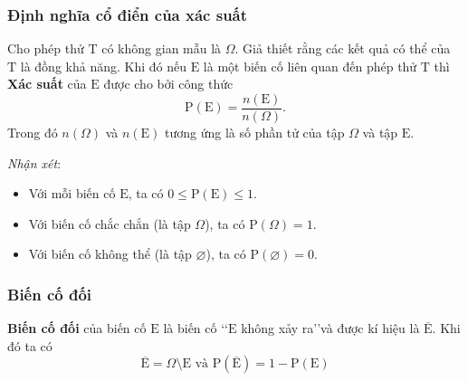\subsubsection{Định nghĩa cổ điển của xác suất}
\begin{boxdn}
		Cho phép thử $ \mathrm{T} $ có không gian mẫu là $ \Omega $. Giả thiết rằng các kết quả có thể của $ \mathrm{T} $ là đồng khả năng. Khi đó nếu $ \mathrm{E} $ là một biến cố liên quan đến phép thử $ \mathrm{T} $ thì {\bf{Xác suất}} của $ \mathrm{E} $ được cho bởi công thức $$\mathrm{P}(\mathrm{E})=\dfrac{n(\mathrm{E})}{n(\Omega)}.$$
	Trong đó $ n(\Omega) $ và $ n(\mathrm{E}) $ tương ứng là số phần tử của tập $ \Omega $ và tập $ \mathrm{E} $.
\end{boxdn}
\textit{Nhận xét}: 
\begin{itemize}
	\item Với mỗi biến cố $ \mathrm{E} $, ta có $ 0\leq \mathrm{P}(\mathrm{E})\leq 1 $.
	\item Với biến cố chắc chắn (là tập $ \Omega $), ta có $ \mathrm{P}(\Omega)=1 $.
	\item Với biến cố không thể (là tập $ \varnothing $), ta có $ \mathrm{P}(\varnothing)=0 $.
\end{itemize}

\subsubsection{Biến cố đối}
\begin{boxdn}
{\bf{Biến cố đối}} của biến cố $ \mathrm{E} $ là biến cố \lq\lq  $ \mathrm{E}$ không xảy ra\rq\rq và được kí hiệu là $ \mathrm{\overline{E}} $. Khi đó ta có
$$\mathrm{\overline{E}} = \Omega \setminus \mathrm{E} \text{ và } \mathrm{P}(\mathrm{\overline{E}}) = 1 - \mathrm{P}(\mathrm{E}) $$

\end{boxdn}

